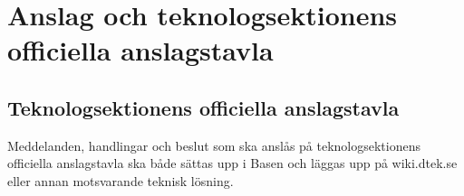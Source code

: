 \section{Anslag och teknologsektionens officiella anslagstavla}
\subsection{Teknologsektionens officiella anslagstavla}
Meddelanden, handlingar och beslut som ska anslås på teknologsektionens
officiella anslagstavla ska både sättas upp i Basen och läggas upp på
wiki.dtek.se eller annan motsvarande teknisk lösning.

